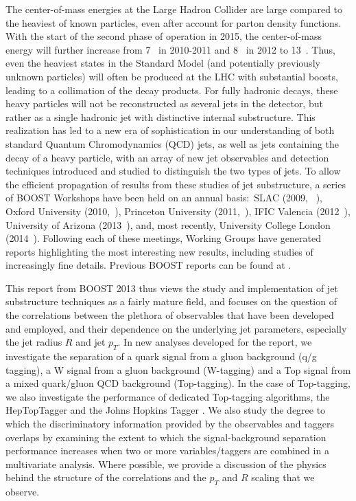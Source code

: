 The center-of-mass energies at the Large Hadron Collider are large compared to the heaviest of known particles, even after account for parton density functions. With the start of the second phase of operation in 2015, the center-of-mass energy will further increase from 7~\tev{} in 2010-2011 and 8~\tev{} in 2012 to 13~\tev{}. Thus, even the heaviest states in the Standard Model (and potentially previously unknown particles) will often be 
produced at the LHC with
substantial boosts, leading to a collimation of the decay products.  For fully hadronic decays, these heavy particles will not be reconstructed as several jets in the detector, but rather
as a single hadronic jet with distinctive internal substructure.  This realization has led to a new era of sophistication
in our understanding of both standard Quantum Chromodynamics (QCD) jets, as well as jets containing the decay of a heavy particle, with an array
of new jet observables and detection techniques introduced and studied to distinguish the two types of jets.  To allow the efficient propagation of 
results from these studies of jet substructure, a series of BOOST Workshops have been held on an annual basis:~SLAC (2009, ~\cite{Boost:2009xx}), 
Oxford University (2010,~\cite{Boost:2010xx}), Princeton 
University  (2011,~\cite{Boost:2011xx}), IFIC Valencia (2012~\cite{Boost:2012xx}), 
University of Arizona (2013~\cite{Boost:2013xx}), and, most recently, University College London (2014~\cite{Boost:2014xx}).
Following each of these meetings, Working Groups have generated reports
highlighting the most interesting new results, including studies of increasingly fine details. Previous BOOST reports
can be found at \cite{Abdesselam:2010pt,Altheimer:2012mn,Altheimer:2013yza}.

This report from BOOST 2013 thus views the study and implementation of jet substructure techniques as a fairly
mature field, and focuses on the question of the correlations between the plethora of observables that have been developed 
and employed, and their dependence on the underlying jet parameters, especially the jet radius $R$ and jet $p_T$. 
In new analyses developed for the report, we investigate the separation of a quark signal from a gluon background (q/g tagging), a W signal from a gluon background (W-tagging) and a Top signal from a mixed quark/gluon QCD background (Top-tagging). In the case of Top-tagging, we also investigate the performance of dedicated Top-tagging algorithms, the HepTopTagger \cite{Plehn:2010st} and the Johns Hopkins Tagger \cite{Kaplan:2008ie}. We also study the degree to which the discriminatory information provided by the observables and taggers overlaps by examining the extent to which the signal-background separation performance increases when two or more variables/taggers are combined in a multivariate analysis. Where possible, we provide a discussion of the physics behind the structure of the correlations and the $p_{T}$ and $R$ scaling that we observe. 


